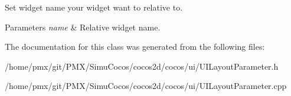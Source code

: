Set widget name your widget want to relative to.


\begin{DoxyParams}{Parameters}
{\em name} & Relative widget name. \\
\hline
\end{DoxyParams}


The documentation for this class was generated from the following files\+:\begin{DoxyCompactItemize}
\item 
/home/pmx/git/\+P\+M\+X/\+Simu\+Cocos/cocos2d/cocos/ui/U\+I\+Layout\+Parameter.\+h\item 
/home/pmx/git/\+P\+M\+X/\+Simu\+Cocos/cocos2d/cocos/ui/U\+I\+Layout\+Parameter.\+cpp\end{DoxyCompactItemize}
